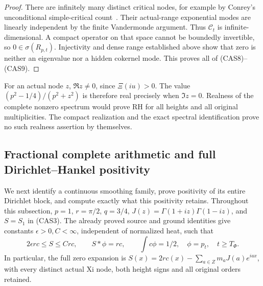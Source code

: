 \documentclass[11pt]{article}
\theoremstyle{remark}\newtheorem{remark}[theorem]{Remark}
\begin{document}
\begin{proof}
There are infinitely many distinct critical nodes, for example
by Conrey's unconditional simple-critical count~\cite{Conrey}.
Their actual-range exponential modes are linearly independent
by the finite Vandermonde argument. Thus \(\mathcal C_t\) is
infinite-dimensional. A compact operator on that space cannot
be boundedly invertible, so \(0\in\sigma(R_{p,t})\).
Injectivity and dense range established above show that zero
is neither an eigenvalue nor a hidden cokernel mode. This proves
all of (CAS8)--(CAS9).
\end{proof}

For an actual node \(z\), \(\Re z\ne0\), since \(\Xi(iu)>0\).
The value \((p^2-1/4)/(p^2+z^2)\) is therefore real precisely when
\(\Im z=0\). Realness of the complete nonzero spectrum would
prove RH for all heights and all original multiplicities.
The compact realization and the exact spectral identification
prove no such realness assertion by themselves.

\subsection{Fractional complete arithmetic and full Dirichlet--Hankel positivity}
\label{sec:fractional-complete-arithmetic}

We next identify a continuous smoothing family, prove positivity of its
entire Dirichlet block, and compute exactly what this positivity retains.
Throughout this subsection, \(p=1\), \(r=\pi/2\), \(q=3/4\),
\(J(z)=\Gamma(1+iz)\Gamma(1-iz)\), and \(S=S_1\) in (CAS3).
The already proved source and ground identities give constants
\(\epsilon>0,C<\infty\), independent of normalized heat, such that
\[
 2\epsilon r c\le S\le Cr c,\qquad S*\phi=rc,
 \qquad \int c\phi=1/2,
 \quad \phi=p_t,\quad t\ge T_\Phi .                       \tag{FH1}
\]
In particular, the full zero expansion is
\(S(x)=2rc(x)-\sum_{a\in Z}m_aJ(a)e^{iax}\), with every distinct
actual Xi node, both height signs and all original orders retained.
\end{document}
